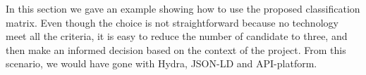 In this section we gave an example showing how to use the proposed classification matrix. Even though the choice is not straightforward because no technology meet all the criteria, it is easy to reduce the number of candidate to three, and then make an informed decision based on the context of the project.
From this scenario, we would have gone with Hydra, JSON-LD and API-platform.
